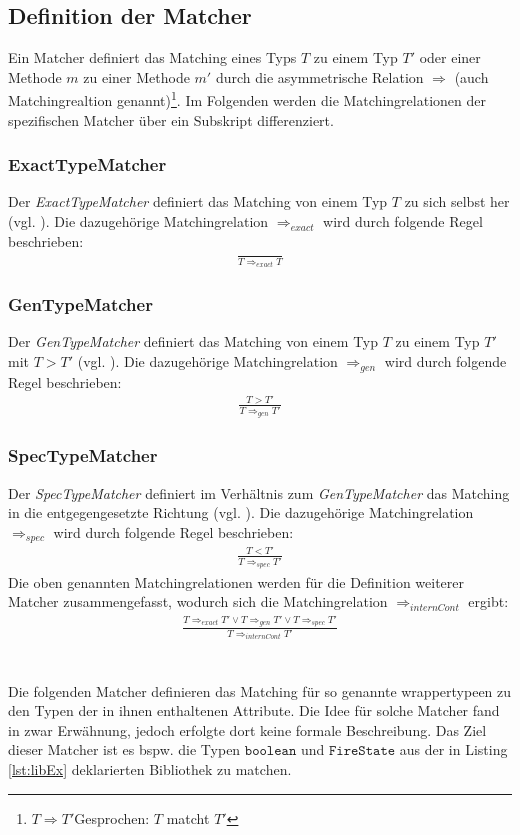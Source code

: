 \subsection{Definition der Matcher}\label{sec_matcher}
Ein Matcher definiert das Matching eines Typs $T$ zu einem Typ $T'$ oder einer Methode $m$ zu einer Methode $m'$ durch die asymmetrische Relation $\Rightarrow$ (auch Matchingrealtion genannt)\footnote{$T \Rightarrow T'$\newline Gesprochen: $T$ matcht $T'$}. Im Folgenden werden die Matchingrelationen der spezifischen Matcher über ein Subskript differenziert.
\subsubsection{ExactTypeMatcher}\label{sec:exacttypematcher}
Der \emph{ExactTypeMatcher} definiert das Matching von einem Typ $T$ zu sich selbst her (vgl. \cite{moormann}). Die dazugehörige Matchingrelation $\Rightarrow_{exact}$ wird durch folgende Regel beschrieben:
\begin{gather*}
\frac{}{T \Rightarrow_{exact} T}
\end{gather*}
\subsubsection{GenTypeMatcher}\label{sec:gentypematcher}
Der \emph{GenTypeMatcher} definiert das Matching von einem Typ $T$ zu einem Typ $T'$ mit $T > T'$ (vgl. \cite{moormann}). Die dazugehörige Matchingrelation $\Rightarrow_{gen}$ wird durch folgende Regel beschrieben:
\begin{gather*}
\frac{T > T'}{T \Rightarrow_{gen} T'}
\end{gather*}
\subsubsection{SpecTypeMatcher}
Der \emph{SpecTypeMatcher} definiert im Verhältnis zum \emph{GenTypeMatcher} das Matching in die entgegengesetzte Richtung (vgl. \cite{moormann}). Die dazugehörige Matchingrelation $\Rightarrow_{spec}$ wird durch folgende Regel beschrieben: 
\begin{gather*}
\frac{T < T'}{T \Rightarrow_{spec} T'}
\end{gather*}
\newpage
\noindent
Die oben genannten Matchingrelationen werden für die Definition weiterer Matcher zusammengefasst, wodurch sich die Matchingrelation $\Rightarrow_{internCont}$ ergibt:
\begin{gather*}
\frac{T \Rightarrow_{exact} T' \vee T \Rightarrow_{gen} T' \vee
T \Rightarrow_{spec} T'  }{T \Rightarrow_{internCont} T'}
\end{gather*}
\noindent
\\\\
Die folgenden Matcher definieren das Matching für so genannte \Gls{wrappertype}en zu den Typen der in ihnen enthaltenen Attribute. Die Idee für solche Matcher fand in \cite{hummel08} zwar Erwähnung, jedoch erfolgte dort keine formale Beschreibung. Das Ziel dieser Matcher ist es bspw. die Typen $\texttt{boolean}$ und $\texttt{FireState}$ aus der in Listing \ref{lst:libEx} deklarierten Bibliothek zu matchen.
